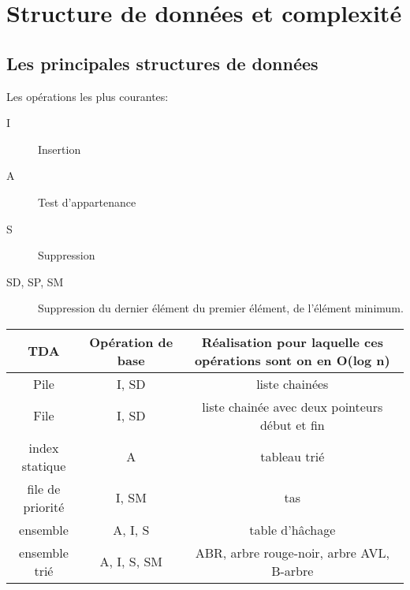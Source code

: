 \chapter{Structure de données et complexité}
\section{Les principales structures de données}
Les opérations les plus courantes: 
\begin{description}
	\item[I]Insertion
	\item[A] Test d'appartenance
	\item[S] Suppression
	\item[SD, SP, SM] Suppression du dernier élément du premier élément, de l'élément minimum.
\end{description}

\begin{tabular}{|c|c|c}
	\textbf{TDA}\footnotemark & \textbf{Opération de base} & \textbf{Réalisation pour laquelle ces opérations sont on en O(log n)}\\
	\hline
	Pile & I, SD & liste chainées\\
	\hline
	File & I, SD & liste chainée avec deux pointeurs début et fin\\
	\hline
	index statique & A & tableau trié\\
	\hline
	file de priorité & I, SM & tas\\
	\hline
	ensemble & A, I, S & table d'hâchage\footnotemark\\
	\hline
	ensemble trié & A, I, S, SM & ABR, arbre rouge-noir, arbre AVL, B-arbre\footnotemark\\
\end{tabular} 
